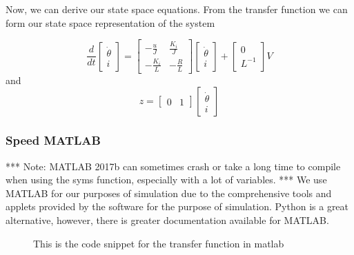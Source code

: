 Now, we can derive our state space equations.
From the transfer function we can form our state space representation of the system

\begin{equation}
\frac{d}{dt} \begin{bmatrix} \dot{\theta} \\ i \end{bmatrix} = \begin{bmatrix} - \frac{u}{J} & \frac{K_{i}}{J} \\ - \frac{K_{i}}{L} & - \frac{R}{L}  \end{bmatrix} \begin{bmatrix} \dot{\theta} \\ i \end{bmatrix} + \begin{bmatrix} 0 \\ L^{-1} \end{bmatrix} V
\end{equation}
and
\begin{equation}
z = \begin{bmatrix} 0 & 1 \end{bmatrix} \begin{bmatrix} \dot{\theta} \\ i \end{bmatrix}
\end{equation}

   	\subsubsection{Speed MATLAB}
    *** Note: MATLAB 2017b can sometimes crash or take a long time to compile when using the syms function, especially with a lot of variables. ***
We use MATLAB for our purposes of simulation due to the comprehensive tools and applets provided by the software for the purpose of simulation. Python is a great alternative, however, there is greater documentation available for MATLAB.
\begin{figure}[H]
\centering
{}
\caption{\label{fig:code_speed1} This is the code snippet for the transfer function in matlab}
\end{figure}

